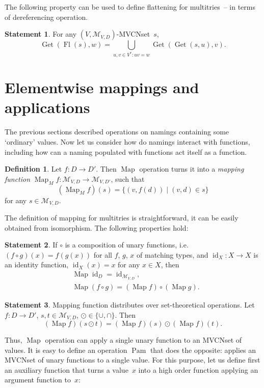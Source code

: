 \documentclass{article}
\theoremstyle{definition}
\newtheorem{Df}{Definition}
\newtheorem{St}{Statement}
\newcommand{\setcharmvcn}{M}
\newcommand{\setsymbol}[3]{\mathcal{#1}_{#2,#3}}
\newcommand{\setmvcn}[2]{\setsymbol{\setcharmvcn}{#1}{#2}}
\newcommand{\flatten}{\operatorname{Fl}}
\newcommand{\deref}{\operatorname{Get}}
\newcommand{\fmap}{\operatorname{Map}}
\newcommand{\fpam}{\operatorname{Pam}}
\newcommand{\id}{\operatorname{id}}
\begin{document}
The following property can be used to define flattening for multitries~--
in terms of dereferencing operation.
\begin{St}\label{st:deref-flatten}
For any $(V,\setmvcn{V}{D})$-MVCNset~$s$,
\[
  \deref(\flatten(s), w) =
      \bigcup_{u,v\in V^\ast: uv = w}
        \deref(\deref(s, u), v) .
\]
\end{St}



\section{Elementwise mappings and applications}

The previous sections described operations on namings containing some
`ordinary' values. Now let us consider how do namings interact with
functions, including how can a naming populated with functions act itself
as a function.

\begin{Df}\label{df:mvcn-map}
Let $f : D \to D'$. Then $\fmap$ operation turns it into a \emph{mapping
function} $\fmap_{\setcharmvcn} f : \setmvcn{V}{D} \to \setmvcn{V}{D'}$, such
that
\[
  (\fmap_{\setcharmvcn} f)(s) = \{ (v, f(d)) \mid (v, d) \in s \}
\]
for any $s \in \setmvcn{V}{D}$.
\end{Df}

The definition of mapping for multitries is straightforward, it can be easily
obtained from isomorphism. The following properties hold:

\begin{St}\label{st:map-properties}
If $\circ$ is a composition of unary functions, i.e. $(f\circ g)(x) = f(g(x))$ for
all $f$, $g$, $x$ of matching types, and $\id_X : X \to X$ is an identity function,
$\id_X(x) = x$ for any $x\in X$, then
\begin{eqnarray*}
  & \fmap \id_D = \id_{\setmvcn{V}{D}} , \\
  & \fmap (f \circ g) = (\fmap f) \circ (\fmap g) .
\end{eqnarray*}
\end{St}

\begin{St}\label{st:map-distributivity}
Mapping function distributes over set-theoretical operations.
Let $f: D \to D'$, $s, t \in \setmvcn{V}{D}$, $\odot \in \{\cup, \cap \}$. Then
\[
  (\fmap f) (s \odot t) = (\fmap f)(s) \odot (\fmap f)(t) .
\]
\end{St}

Thus, $\fmap$ operation can apply a single unary function to an MVCNset of
values. It is easy to define an operation $\fpam$ that does the opposite:
applies an MVCNset of unary functions to a single value. For this purpose,
let us define first an auxiliary function that turns a value~$x$ into a
high order function applying an argument function to~$x$:
\end{document}
